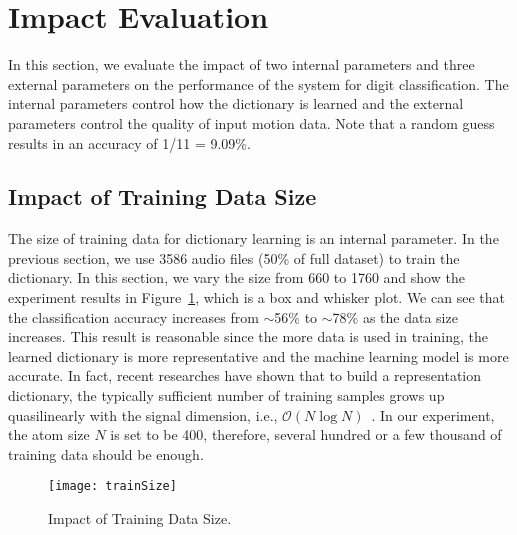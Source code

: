 \section{Impact Evaluation}\label{sec:impact}
In this section, we evaluate the impact of two internal parameters and three external parameters on the performance of the {\systemName} system for digit classification. 
The internal parameters control how the dictionary is learned and the external parameters control the quality of input motion data. 
Note that a random guess results in an accuracy of 1/11 = 9.09\%.

\subsection{Impact of Training Data Size}\label{sec:impact:trainsize}
The size of training data for dictionary learning is an internal parameter. In the previous section, we use 3586 audio files (50\% of full dataset)  to train the dictionary. In this section, we vary the size from 660 to 1760 and show the experiment results in Figure~\ref{fig:trainSize}, which is a box and whisker plot.
We can see that the classification accuracy increases from $\sim$56\% to $\sim$78\% as the data size increases.  This result is reasonable since the more data is used in training, the learned dictionary is more representative and the machine learning model is more accurate. 
%
In fact, recent researches have shown that to build a representation dictionary, the typically sufficient number of training samples grows up quasilinearly with the signal dimension, i.e., $\mathcal{O}(N\log N)$~\cite{remi2010dictionary}. In our experiment, the atom size $N$ is set to be 400, therefore, several hundred or a few thousand of training data should be enough.

\begin{figure}[h]
	\centering
	\texttt{[image: trainSize]}
		\vspace{-.1in}
	\caption{Impact of Training Data Size.}
	\label{fig:trainSize}
		\vspace{-.1in}
\end{figure}

